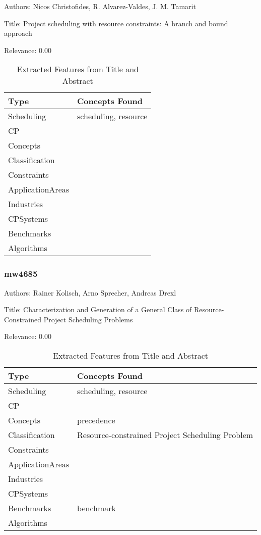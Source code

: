 Authors: Nicos Christofides, R. Alvarez-Valdes, J. M. Tamarit

Title: Project scheduling with resource constraints: A branch and bound approach

Relevance:  0.00

{\scriptsize
\begin{longtable}{p{2cm}p{20cm}}
\caption{Extracted Features from Title and Abstract}\\ \toprule
Type & Concepts Found\\ \midrule
\endhead
\bottomrule
\endfoot
Scheduling & scheduling, resource\\ 
CP & \\ 
Concepts & \\ 
Classification & \\ 
Constraints & \\ 
ApplicationAreas & \\ 
Industries & \\ 
CPSystems & \\ 
Benchmarks & \\ 
Algorithms & \\ 
\end{longtable}
}



\subsubsection{mw4685}
\label{mw:mw4685}

Authors: Rainer Kolisch, Arno Sprecher, Andreas Drexl

Title: Characterization and Generation of a General Class of Resource-Constrained Project Scheduling Problems

Relevance:  0.00

{\scriptsize
\begin{longtable}{p{2cm}p{20cm}}
\caption{Extracted Features from Title and Abstract}\\ \toprule
Type & Concepts Found\\ \midrule
\endhead
\bottomrule
\endfoot
Scheduling & scheduling, resource\\ 
CP & \\ 
Concepts & precedence\\ 
Classification & Resource-constrained Project Scheduling Problem\\ 
Constraints & \\ 
ApplicationAreas & \\ 
Industries & \\ 
CPSystems & \\ 
Benchmarks & benchmark\\ 
Algorithms & \\ 
\end{longtable}
}


